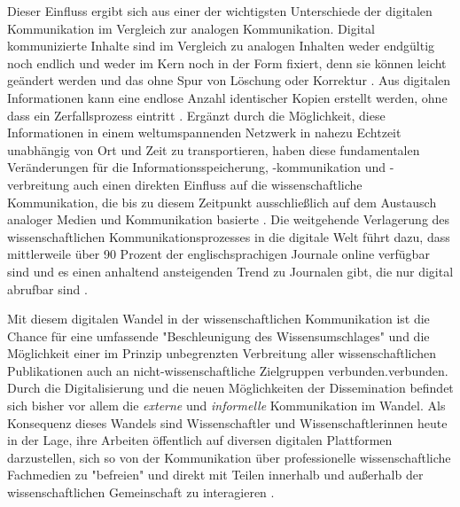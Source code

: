 Dieser Einfluss ergibt sich aus einer der wichtigsten Unterschiede der digitalen Kommunikation im Vergleich zur analogen Kommunikation. Digital kommunizierte Inhalte sind im Vergleich zu analogen Inhalten weder endgültig noch endlich und weder im Kern noch in der Form fixiert, denn sie können leicht geändert werden und das ohne Spur von Löschung oder Korrektur \cite{Smith_1999b}. Aus digitalen Informationen kann eine endlose Anzahl identischer Kopien erstellt werden, ohne dass ein Zerfallsprozess eintritt \cite{Smith_1999b}. Ergänzt durch die Möglichkeit, diese Informationen in einem weltumspannenden Netzwerk in nahezu Echtzeit unabhängig von Ort und Zeit zu transportieren, haben diese fundamentalen Veränderungen für die Informationsspeicherung, -kommunikation und -verbreitung auch einen direkten Einfluss auf die wissenschaftliche Kommunikation, die bis zu diesem Zeitpunkt ausschließlich auf dem Austausch analoger Medien und Kommunikation basierte \cite{Seidenfaden_2005}. Die weitgehende Verlagerung des wissenschaftlichen Kommunikationsprozesses in die digitale Welt führt dazu, dass mittlerweile über 90 Prozent der englischsprachigen Journale online verfügbar sind und es einen anhaltend ansteigenden Trend zu Journalen gibt, die nur digital abrufbar sind \cite{Cope_2014} \cite[:233]{Gould_2009} \cite{Willinsky_2006}.

Mit diesem digitalen Wandel in der wissenschaftlichen Kommunikation ist die Chance für eine umfassende "Beschleunigung des Wissensumschlages" \cite{Wenzel_2003} und die Möglichkeit einer im Prinzip unbegrenzten Verbreitung aller wissenschaftlichen Publikationen \cite[:11]{BBAW_2015} \cite{Yiotis_2013} auch an nicht-wissenschaftliche Zielgruppen \cite{Konneker_2013} verbunden.verbunden. Durch die Digitalisierung und die neuen Möglichkeiten der Dissemination befindet sich bisher vor allem die \textit{externe} und \textit{informelle} Kommunikation im Wandel. Als Konsequenz dieses Wandels sind Wissenschaftler und Wissenschaftlerinnen heute in der Lage, ihre Arbeiten öffentlich auf diversen digitalen Plattformen darzustellen, sich so von der Kommunikation über professionelle wissenschaftliche Fachmedien zu "befreien" und direkt mit Teilen innerhalb und außerhalb der wissenschaftlichen Gemeinschaft zu interagieren \cite{Konneker_2013}.

